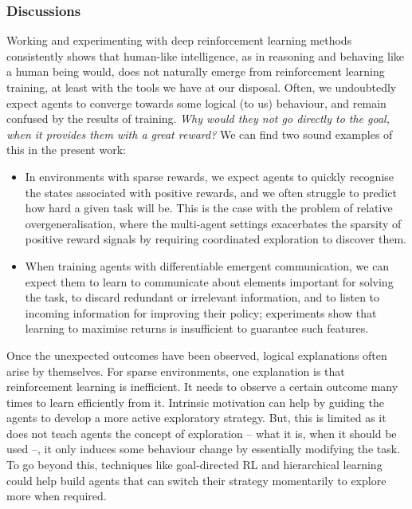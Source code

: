 \subsubsection{Discussions}

Working and experimenting with deep reinforcement learning methods consistently shows that human-like intelligence, as in reasoning and behaving like a human being would, does not naturally emerge from reinforcement learning training, at least with the tools we have at our disposal. 
Often, we undoubtedly expect agents to converge towards some logical (to us) behaviour, and remain confused by the results of training. \textit{Why would they not go directly to the goal, when it provides them with a great reward?}
We can find two sound examples of this in the present work:
\begin{itemize}
    \item In environments with sparse rewards, we expect agents to quickly recognise the states associated with positive rewards, and we often struggle to predict how hard a given task will be. This is the case with the problem of relative overgeneralisation, where the multi-agent settings exacerbates the sparsity of positive reward signals by requiring coordinated exploration to discover them. 
    \item When training agents with differentiable emergent communication, we can expect them to learn to communicate about elements important for solving the task, to discard redundant or irrelevant information, and to listen to incoming information for improving their policy; experiments show that learning to maximise returns is insufficient to guarantee such features. 
\end{itemize}

Once the unexpected outcomes have been observed, logical explanations often arise by themselves. For sparse environments, one explanation is that reinforcement learning is inefficient. It needs to observe a certain outcome many times to learn efficiently from it. Intrinsic motivation can help by guiding the agents to develop a more active exploratory strategy. But, this is limited as it does not teach agents the concept of exploration -- what it is, when it should be used --, it only induces some behaviour change by essentially modifying the task. To go beyond this, techniques like goal-directed RL and hierarchical learning could help build agents that can switch their strategy momentarily to explore more when required. 

